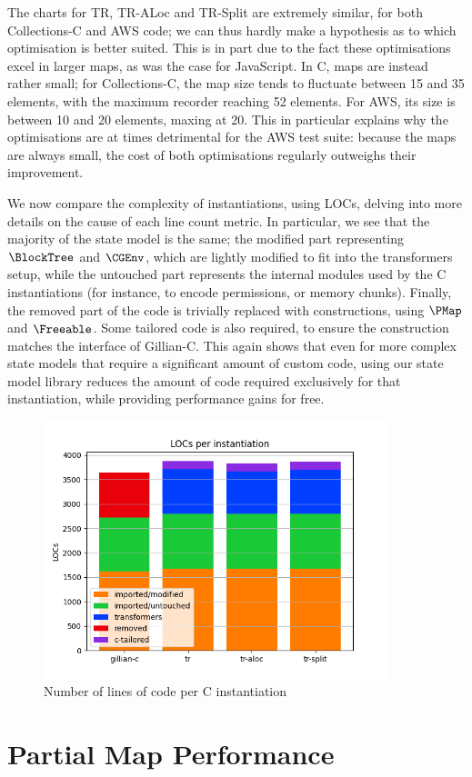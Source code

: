 The charts for TR, TR-ALoc and TR-Split are extremely similar, for both Collections-C and AWS code; we can thus hardly make a hypothesis as to which optimisation is better suited. This is in part due to the fact these optimisations excel in larger maps, as was the case for JavaScript. In C, maps are instead rather small; for Collections-C, the map size tends to fluctuate between 15 and 35 elements, with the maximum recorder reaching 52 elements. For AWS, its size is between 10 and 20 elements, maxing at 20. This in particular explains why the optimisations are at times detrimental for the AWS test suite: because the maps are always small, the cost of both optimisations regularly outweighs their improvement.

We now compare the complexity of instantiations, using LOCs, delving into more details on the cause of each line count metric. In particular, we see that the majority of the state model is the same; the modified part representing $\BlockTree$ and $\CGEnv$, which are lightly modified to fit into the transformers setup, while the untouched part represents the internal modules used by the C instantiations (for instance, to encode permissions, or memory chunks). Finally, the removed part of the code is trivially replaced with constructions, using $\PMap$ and $\Freeable$. Some tailored code is also required, to ensure the construction matches the interface of Gillian-C. This again shows that even for more complex state models that require a significant amount of custom code, using our state model library reduces the amount of code required exclusively for that instantiation, while providing performance gains for free.

\begin{figure}
	\centering
	\includegraphics[width=10cm]{figures/c-loc-count.png}
	\caption{Number of lines of code per C instantiation}
	\label{fig:c-loc-count}
\end{figure}


\section{Partial Map Performance} \label{sec:perf-pmap}


